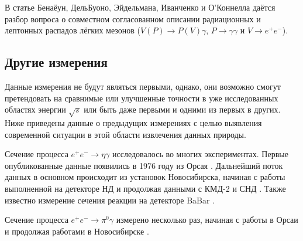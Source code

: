 В статье Бенаёун, ДельБуоно, Эйдельмана, Иванченко и О'Коннелла \cite{Benayoun:1999fv} даётся разбор
вопроса о совместном согласованном описании радиационных и лептонных
распадов лёгких мезонов ($V(P) \to P(V)\gamma$, $P \to \gamma \gamma$ и
$V \to e^+ e^-$).


\subsection{Другие измерения}\label{other-measurments}

Данные измерения не будут являться первыми, однако, они возможно смогут
претендовать на сравнимые или улучшенные точности в уже исследованных
областях энергии $\sqrt{s}$ или быть даже первыми и одними из первых в
других. Ниже приведены данные о предыдущих измерениях с целью выявления
современной ситуации в этой области извлечения данных природы.

Сечение процесса $e^+e^-\to\eta\gamma$ исследовалось во многих экспериментах.
Первые опубликованные данные появились в 1976 году из Орсая \cite{Cosme:1975rs}.
Дальнейший поток данных в основном происходит из установок Новосибирска, начиная с работы выполненной на детекторе НД \cite{Druzhinin:1984zq} и продолжая данными с КМД-2 \cite{Akhmetshin:1995vz, Akhmetshin:1999zv, Akhmetshin:2001hm, Akhmetshin:2004gw} и СНД \cite{Achasov:1997nq, Achasov:2000zd, Achasov:2006dv, Achasov:2013eli}.
Также известно измерение сечения реакции на детекторе BaBar \cite{Aubert:2006cy}.

Сечение процесса $e^+e^-\to\pi^0\gamma$ измерено несколько раз, начиная с работы в Орсаи \cite{Cosme:1975rs} и продолжая работами в Новосибирске \cite{Druzhinin:1984zq, Achasov:2000zd, Achasov:2003ed, Akhmetshin:2004gw, Achasov:2016bfr}.